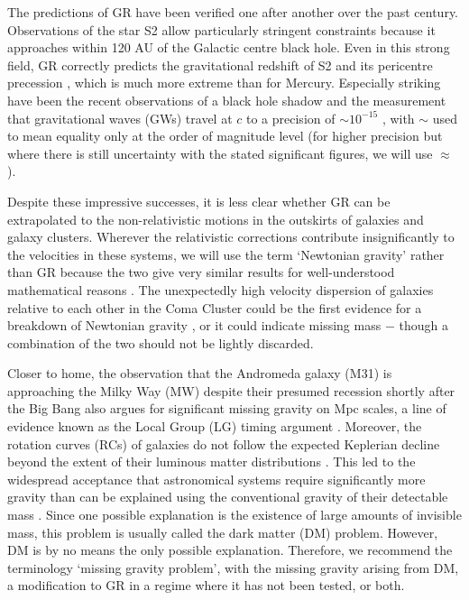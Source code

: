 \documentclass[fleqn,usenatbib,useAMS,onecolumn]{mnras} %
\begin{document}
The predictions of GR have been verified one after another over the past century. Observations of the star S2 allow particularly stringent constraints because it approaches within 120 AU of the Galactic centre black hole. Even in this strong field, GR correctly predicts the gravitational redshift of S2 \citep{Gravity_2018} and its pericentre precession \citep{Gravity_2020}, which is much more extreme than for Mercury. Especially striking have been the recent observations of a black hole shadow \citep{Event_Horizon_Telescope_2019} and the measurement that gravitational waves (GWs) travel at $c$ to a precision of $\sim 10^{-15}$ \citep{LIGO_Virgo_2017}, with $\sim$ used to mean equality only at the order of magnitude level (for higher precision but where there is still uncertainty with the stated significant figures, we will use $\approx$).

Despite these impressive successes, it is less clear whether GR can be extrapolated to the non-relativistic motions in the outskirts of galaxies and galaxy clusters. Wherever the relativistic corrections contribute insignificantly to the velocities in these systems, we will use the term `Newtonian gravity' rather than GR because the two give very similar results for well-understood mathematical reasons \citep{Rowland_2015, Almeida_2016}. The unexpectedly high velocity dispersion of galaxies relative to each other in the Coma Cluster could be the first evidence for a breakdown of Newtonian gravity \citep[and thus GR;][]{Zwicky_1933, Zwicky_1937}, or it could indicate missing mass $-$ though a combination of the two should not be lightly discarded.

Closer to home, the observation that the Andromeda galaxy (M31) is approaching the Milky Way (MW) despite their presumed recession shortly after the Big Bang also argues for significant missing gravity on Mpc scales, a line of evidence known as the Local Group (LG) timing argument \citep{Kahn_Woltjer_1959}. Moreover, the rotation curves (RCs) of galaxies do not follow the expected Keplerian decline beyond the extent of their luminous matter distributions \citep[][and references therein]{Faber_1979}. This led to the widespread acceptance that astronomical systems require significantly more gravity than can be explained using the conventional gravity of their detectable mass \citep[for a historical review, see][]{Sanders_2010}. Since one possible explanation is the existence of large amounts of invisible mass, this problem is usually called the dark matter (DM) problem. However, DM is by no means the only possible explanation. Therefore, we recommend the terminology `missing gravity problem', with the missing gravity arising from DM, a modification to GR in a regime where it has not been tested, or both.
\end{document}
